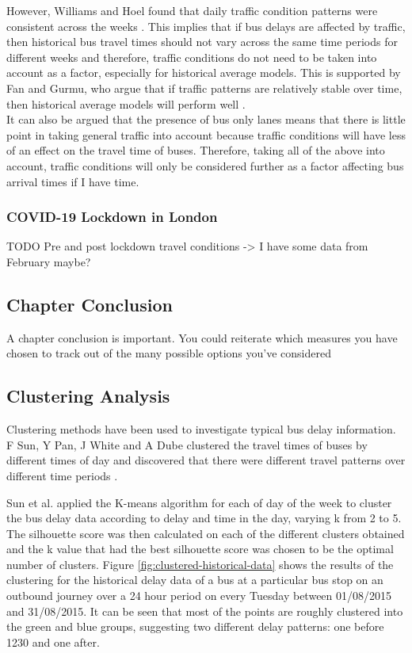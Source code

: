 However, Williams and Hoel found that daily traffic condition patterns were consistent across the weeks \cite{consistent-traffic}. This implies that if bus delays are affected by traffic, then historical bus travel times should not vary across the same time periods for different weeks and therefore, traffic conditions do not need to be taken into account as a factor, especially for historical average models. This is supported by Fan and Gurmu, who argue that if traffic patterns are relatively stable over time, then historical average models will perform well \cite{dynamic-gps}. \\

It can also be argued that the presence of bus only lanes means that there is little point in taking general traffic into account because traffic conditions will have less of an effect on the travel time of buses. Therefore, taking all of the above into account, traffic conditions will only be considered further as a factor affecting bus arrival times if I have time.

\subsubsection{COVID-19 Lockdown in London}

TODO Pre and post lockdown travel conditions -> I have some data from February maybe?

\subsection{Chapter Conclusion}

A chapter conclusion is important. You could reiterate which measures you have chosen to track out of the many possible options you've considered

\subsection{Clustering Analysis}

Clustering methods have been used to investigate typical bus delay information. F Sun, Y Pan, J White and A Dube clustered the travel times of buses by different times of day and discovered that there were different travel patterns over different time periods \cite{smart-public-transport}.

Sun et al. applied the K-means algorithm for each of day of the week to cluster the bus delay data according to delay and time in the day, varying k from 2 to 5. The silhouette score was then calculated on each of the different clusters obtained and the k value that had the best silhouette score was chosen to be the optimal number of clusters. Figure \ref{fig:clustered-historical-data} shows the results of the clustering for the historical delay data of a bus at a particular bus stop on an outbound journey over a 24 hour period on every Tuesday between 01/08/2015 and 31/08/2015. It can be seen that most of the points are roughly clustered into the green and blue groups, suggesting two different delay patterns: one before 1230 and one after. 


